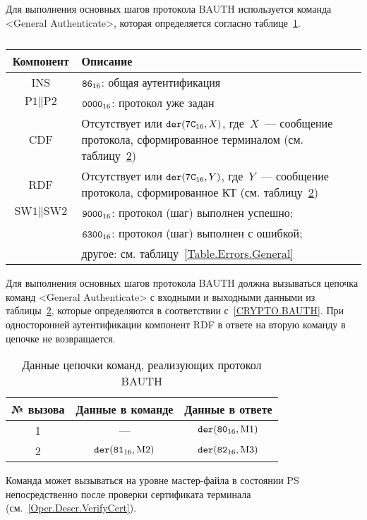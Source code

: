 Для выполнения основных шагов протокола BAUTH 
используется команда <General Authenticate>, 
которая определяется согласно 
таблице~\ref{Table.Oper.GABAUTHCmd}.

\begin{table}[hbt]
\caption{}\label{Table.Oper.GABAUTHCmd}
\begin{tabular}{|c|p{14cm}|}
\hline
Компонент & 	Описание \\
\hline
\hline
INS & $\texttt{86}_{16}$: общая аутентификация \\
\hline
$\text{P1} \parallel \text{P2}$ & $\texttt{0000}_{16}$: протокол уже задан\\ 
\hline
CDF & Отсутствует или $\texttt{der}(\texttt{7C}_{16}, X)$, 
где~$X$~--- сообщение протокола, сформированное терминалом
(см. таблицу~\ref{Table.Oper.BAUTH})\\
\hline 
RDF & Отсутствует или $\texttt{der}(\texttt{7C}_{16}, Y)$, где~$Y$~--- 
сообщение протокола, сформированное КТ 
(см. таблицу~\ref{Table.Oper.BAUTH})\\
\hline
$\text{SW1} \parallel \text{SW2}$ & $\texttt{9000}_{16}$: протокол (шаг) выполнен успешно; \\
& $\texttt{6300}_{16}$: протокол (шаг) выполнен с ошибкой;\\
  & другое: см. таблицу~\ref{Table.Errors.General} \\
\hline
\end{tabular}
\end{table}

Для выполнения основных шагов протокола BAUTH
должна вызываться цепочка команд <General Authenticate> 
с входными и выходными данными из таблицы~\ref{Table.Oper.BAUTH}, 
которые определяются в соответствии с~\ref{CRYPTO.BAUTH}. 
При односторонней аутентификации компонент RDF в ответе на вторую команду
в цепочке не возвращается.

\begin{table}[hbt]
\caption{Данные цепочки команд, реализующих протокол BAUTH}
\label{Table.Oper.BAUTH}
\begin{tabular}{|c|c|c|}
\hline
№ вызова & Данные в команде & Данные в ответе\\
\hline
\hline
1 & --- & $\texttt{der}(\texttt{80}_{16}, \text{M1})$\\
\hline
2 & $\texttt{der}(\texttt{81}_{16}, \text{M2})$ & 
$\texttt{der}(\texttt{82}_{16}, \text{M3})$  \\
\hline
\end{tabular}
\end{table}

Команда может вызываться на уровне мастер-файла в состоянии PS 
непосредственно после проверки сертификата терминала
(см.~\ref{Oper.Descr.VerifyCert}).

